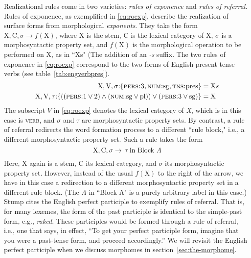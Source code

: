 Realizational rules come in two varieties:
\emph{rules of exponence} and \emph{rules of referral}. Rules of exponence, as exemplified in \eqref{eq:roexp}, describe the 
realization of surface forms from morphological \emph{exponents}. They take the form 
$\text{X},\text{C},\sigma \to f(\text{X})$, where X is the stem, C is the lexical category of X, 
$\sigma$ is a morphosyntactic property set,  and $f(\text{X})$ is the morphological operation to be performed 
on X, as in ``Xs" (The addition of an \emph{-s} suffix. The two rules of exponence in \eqref{eq:roexp}  
correspond to the two forms 
of English present-tense verbs (see table~\ref{tab:engverbpres}). 
\begin{align}
\label{eq:roexp}
	\text{X},\text{V},\sigma\text{:}\{ \textsc{pers:3}\text{,} \, \textsc{num:}\text{sg,} \, \textsc{tns:}\text{pres} \} &= \text{X}s \\ \label{eq:roexp1}
	\text{X},\text{V},\tau\text{:}\{((\textsc{pers:}\text{1}\vee\text{2}) \land (\textsc{num:}\text{sg}\vee\text{pl})) \vee (\textsc{pers:}3 \vee \text{sg})\} &= \text{X} 
\end{align}
The subscript $V$ in \eqref{eq:roexp} denotes the lexical category of \textit{X}, which is  
in this case is \textsc{verb}, 
and $\sigma$ and $\tau$ are morphosyntactic property sets. 
By contrast, a rule of referral redirects the word formation process to a different ``rule block," i.e.,
a different morphosyntactic property set. Such a rule takes the form 
\begin{equation}
\label{eq:ror}
\text{X}, \text{C}, \sigma \to \, \tau \, \text{in Block \textit{A}}
\end{equation}
Here, X again is a stem, 
C its lexical category, and $\sigma$ its morphosyntactic property set. However, instead of the usual $f(\text{X})$ 
to the right of the arrow, we have in this case a redirection to a 
different morphosyntactic property set in a different rule block. (The \textit{A} in ``Block A" 
is a purely arbitrary label in this case.) Stump cites the English perfect participle 
to exemplify rules of referral. That is, for many lexemes, the form of the 
past participle is identical to the simple-past form, e.g., \textit{raked}. 
These participles would be formed through a rule of referral, i.e., one that 
says, in effect, ``To get your perfect participle form, imagine that you 
were a past-tense form, and proceed accordingly.''  We will revisit the English 
perfect participle when we discuss morphomes 
in section~\ref{sec:the-morphome}.

